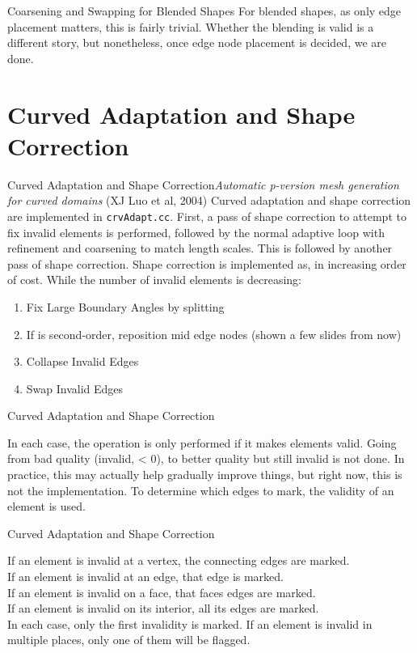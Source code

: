 \documentclass[12pt]{beamer}
\newcommand{\spa}{\vspace{0.5cm}\newline}
\begin{document}
\begin{frame}{Coarsening and Swapping for Blended Shapes}
For blended shapes, as only edge placement matters, this is fairly trivial. Whether the blending is valid is a different story, but nonetheless, once edge node placement is decided, we are done.

\end{frame}
\section{Curved Adaptation and Shape Correction}

\begin{frame}{Curved Adaptation and Shape Correction}{\textit{Automatic p-version mesh generation for curved domains} (XJ Luo et al, 2004)}
Curved adaptation and shape correction are implemented in \texttt{crvAdapt.cc}. First, a pass of shape correction to attempt to fix invalid elements is performed, followed by the normal adaptive loop with refinement and coarsening to match length scales. This is followed by another pass of shape correction. Shape correction is implemented as, in increasing order of cost.\spa
While the number of invalid elements is decreasing:
\begin{enumerate}
\item Fix Large Boundary Angles by splitting
\item If is second-order, reposition mid edge nodes (shown a few slides from now)
\item Collapse Invalid Edges
\item Swap Invalid Edges
\end{enumerate}
\end{frame}
\begin{frame}{Curved Adaptation and Shape Correction}

In each case, the operation is only performed if it makes elements valid. Going from bad quality (invalid, < 0), to better quality but still invalid is not done. In practice, this may actually help gradually improve things, but right now, this is not the implementation. \spa
To determine which edges to mark, the validity of an element is used.
\end{frame}
\begin{frame}{Curved Adaptation and Shape Correction}

If an element is invalid at a vertex, the connecting edges are marked.\\
If an element is invalid at an edge, that edge is marked. \\
If an element is invalid on a face, that faces edges are marked.\\
If an element is invalid on its interior, all its edges are marked.\\
In each case, only the first invalidity is marked. If an element is invalid in multiple places, only one of them will be flagged.
\end{frame}
\end{document}
